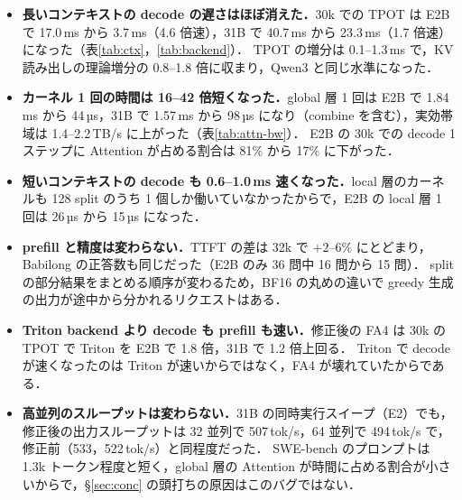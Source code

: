 \begin{itemize}
\item \textbf{長いコンテキストの decode の遅さはほぼ消えた．}30k での TPOT は E2B で 17.0\,ms から 3.7\,ms（4.6 倍速），31B で 40.7\,ms から 23.3\,ms（1.7 倍速）になった（表\ref{tab:ctx}，\ref{tab:backend}）．
      TPOT の増分は 0.1--1.3\,ms で，KV 読み出しの理論増分の 0.8--1.8 倍に収まり，Qwen3 と同じ水準になった．
\item \textbf{カーネル 1 回の時間は 16--42 倍短くなった．}global 層 1 回は E2B で 1.84\,ms から 44\,µs，31B で 1.57\,ms から 98\,µs になり（combine を含む），実効帯域は 1.4--2.2\,TB/s に上がった（表\ref{tab:attn-bw}）．
      E2B の 30k での decode 1 ステップに Attention が占める割合は 81\% から 17\% に下がった．
\item \textbf{短いコンテキストの decode も 0.6--1.0\,ms 速くなった．}local 層のカーネルも 128 split のうち 1 個しか働いていなかったからで，E2B の local 層 1 回は 26\,µs から 15\,µs になった．
\item \textbf{prefill と精度は変わらない．}TTFT の差は 32k で $+2$--$6\%$ にとどまり，Babilong の正答数も同じだった（E2B のみ 36 問中 16 問から 15 問）．
      split の部分結果をまとめる順序が変わるため，BF16 の丸めの違いで greedy 生成の出力が途中から分かれるリクエストはある．
\item \textbf{Triton backend より decode も prefill も速い．}修正後の FA4 は 30k の TPOT で Triton を E2B で 1.8 倍，31B で 1.2 倍上回る．
      Triton で decode が速くなったのは Triton が速いからではなく，FA4 が壊れていたからである．
\item \textbf{高並列のスループットは変わらない．}31B の同時実行スイープ（E2）でも，修正後の出力スループットは 32 並列で 507\,tok/s，64 並列で 494\,tok/s で，修正前（533，522\,tok/s）と同程度だった．
      SWE-bench のプロンプトは 1.3k トークン程度と短く，global 層の Attention が時間に占める割合が小さいからで，\S\ref{sec:conc} の頭打ちの原因はこのバグではない．
\end{itemize}

